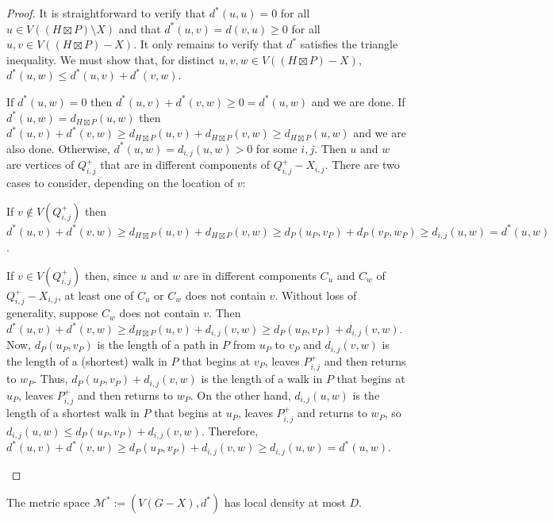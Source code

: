 \documentclass{patmorin}
\renewcommand{\ge}{\geqslant}
\renewcommand{\le}{\leqslant}
\begin{document}
\begin{proof}
  It is straightforward to verify that $d^*(u,u)=0$ for all $u\in V((H\boxtimes P)\setminus X)$ and that $d^*(u,v)=d(v,u)\ge 0$ for all $u,v\in V((H\boxtimes P)-X)$.  It only remains to verify that $d^*$ satisfies the triangle inequality.  We must show that, for distinct $u,v,w\in V((H\boxtimes P)-X)$, $d^*(u,w)\le d^*(u,v)+d^*(v,w)$.

  If $d^*(u,w)=0$ then $d^*(u,v)+d^*(v,w)\ge 0=d^*(u,w)$ and we are done.  If $d^*(u,w)=d_{H\boxtimes P}(u,w)$ then $d^*(u,v)+d^*(v,w)\ge d_{H\boxtimes P}(u,v)+d_{H\boxtimes P}(v,w)\ge d_{H\boxtimes P}(u,w)$ and we are also done.  Otherwise, $d^*(u,w)=d_{i,j}(u,w)>0$ for some $i,j$.  Then $u$ and $w$ are vertices of $Q^+_{i,j}$ that are in different components of $Q^+_{i,j}-X_{i,j}$.  There are two cases to consider, depending on the location of $v$:
  \begin{compactenum}
    \item If $v\not\in V(Q^+_{i,j})$ then $d^*(u,v)+d^*(v,w)\ge d_{H\boxtimes P}(u,v)+d_{H\boxtimes P}(v,w) \ge d_P(u_P,v_P)+d_P(v_P,w_P)\ge d_{i,j}(u,w)=d^*(u,w)$.

    \item If $v\in V(Q^+_{i,j})$ then, since $u$ and $w$ are in different components $C_u$ and $C_w$ of $Q^+_{i,j}-X_{i,j}$, at least one of $C_u$ or $C_w$ does not contain $v$.  Without loss of generality, suppose $C_w$ does not contain $v$.  Then $d^*(u,v)+d^*(v,w)\ge d_{H\boxtimes P}(u,v)+d_{i,j}(v,w) \ge d_{P}(u_P,v_P)+d_{i,j}(v,w)$.  Now, $d_{P}(u_P,v_P)$ is the length of a path in $P$ from $u_P$ to $v_P$ and $d_{i,j}(v,w)$ is the length of a (shortest) walk in $P$ that begins at $v_P$, leaves $P^+_{i,j}$ and then returns to $w_P$. Thus,   $d_{P}(u_P,v_P)+d_{i,j}(v,w)$ is the length of a walk in $P$ that begins at $u_P$, leaves $P^+_{i,j}$ and then returns to $w_P$. On the other hand, $d_{i,j}(u,w)$ is the length of a shortest walk in $P$ that begins at $u_P$, leaves $P^+_{i,j}$ and returns to $w_P$, so $d_{i,j}(u,w)\le d_P(u_P,v_P)+d_{i,j}(v,w)$.  Therefore, $d^*(u,v)+d^*(v,w)\ge d_{P}(u_P,v_P)+d_{i,j}(v,w)\ge d_{i,j}(u,w)=d^*(u,w)$. \qedhere
  \end{compactenum}
\end{proof}


\begin{clm}\label{delta_density}
  The metric space $\mathcal{M}^*:=(V(G-X),d^*)$ has local density at most $D$.
\end{clm}
\end{document}
